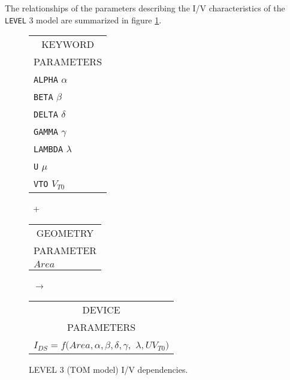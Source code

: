 \noindent
The relationships of the parameters describing the I/V
characteristics of the {\tt LEVEL} 3 model are summarized in figure
\ref{fig:blevel3i/v}.\\[0.1in]
\begin{figure}[h]
\begin{tabular}[t]{|p{1in}|}
\hline
\multicolumn{1}{|c|}{KEYWORD} \\
\multicolumn{1}{|c|}{PARAMETERS} \\
\hline
\hline
{\tt ALPHA} \hfill $\alpha$\\
{\tt BETA} \hfill $\beta$\\
{\tt DELTA} \hfill $\delta$\\
{\tt GAMMA} \hfill $\gamma$\\
{\tt LAMBDA} \hfill $\lambda$\\
{\tt U} \hfill $\mu$\\
{\tt VTO} \hfill $V_{T0}$\\
\hline
\end{tabular}
\hfill
\parbox{0.2in}{\ \vspace*{0.2in}\newline +}
\hfill
\begin{tabular}[t]{|p{1in}|}
\hline
\multicolumn{1}{|c|}{GEOMETRY} \\
\multicolumn{1}{|c|}{PARAMETER} \\
\hline
\hspace*{\fill}$Area$\\
\hline
\end{tabular}
\hfill
\parbox{0.2in}{\ \vspace*{0.2in}\newline $\rightarrow$}
\hfill
\begin{tabular}[t]{|p{1.8in}|}
\hline
\multicolumn{1}{|c|}{DEVICE} \\
\multicolumn{1}{|c|}{PARAMETERS} \\
\hline
$I_{DS} = f(Area, \alpha, \beta, \delta, \gamma,$\newline\hspace*{\fill}
$\lambda, U V_{T0})$\\
\hline
\end{tabular}
\caption{LEVEL 3 (TOM model) I/V dependencies. \label{fig:blevel3i/v}}
\end{figure}


